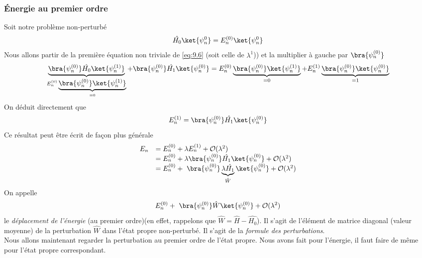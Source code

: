 		\subsubsection{Énergie au premier ordre}
		Soit notre problème non-perturbé
		\begin{equation}
		\hat{H_0}\ket{\psi_n^{0}} = E_n^{(0)}\ket{\psi_n^{0}}
		\end{equation}
		Nous allons partir de la première équation non triviale de \eqref{eq:9.6} (soit 
		celle de $\lambda^1$)) et la multiplier à gauche par $\bra{\psi_n^{(0)}}$
		\begin{equation}
		\underbrace{\bra{\psi_n^{(0)}}\hat{H_0}\ket{\psi_n^{(1)}}}_{E_n^{(0)}\underbrace{
		\bra{\psi_n^{(0)}}\ket{\psi_n^{(1)}}}_{=0}}+\bra{\psi_n^{(0)}}\hat{H_1}\ket{\psi_n^{(0)}} 
		= E_n^{(0)}\underbrace{\bra{\psi_n^{(0)}}\ket{\psi_n^{(1)}}}_{=0}+E_n^{(1)}\underbrace{
		\bra{\psi_n^{(0)}}\ket{\psi_n^{(0)}}}_{=1}
		\end{equation}
		On déduit directement que 
		\begin{equation}
		E_n^{(1)} = \bra{\psi_n^{(0)}}\hat{H_1}\ket{\psi_n^{(0)}}
		\end{equation}
		Ce résultat peut être écrit de façon plus générale
		\begin{equation}
		\begin{array}{ll}
		E_n &= E_n^{(0)}+\lambda E_n^{(1)}+\mathcal{O}(\lambda^2)\\
		&= E_n^{(0)}+\lambda \bra{\psi_n^{(0)}}\hat{H_1}\ket{\psi_n^{(0)}}+\mathcal{O}(\lambda^2)\\
		&= E_n^{(0)}+\ \bra{\psi_n^{(0)}}\underbrace{\lambda\hat{H_1}}_{\hat{W}}\ket{\psi_n
		^{(0)}}+\mathcal{O}(\lambda^2)\\		
		\end{array}
		\end{equation}
		On appelle
		\begin{equation}
		E_n^{(0)}+\ \bra{\psi_n^{(0)}}\hat{W}\ket{\psi_n	^{(0)}}+\mathcal{O}(\lambda^2)
		\end{equation}
		le \textit{déplacement de l'énergie} (au premier ordre)(en effet, rappelons que
		$\hat{W}=\hat{H}-\hat{H_0}$). Il s'agit de l'élément de matrice diagonal (valeur 
		moyenne) de la perturbation $\hat{W}$ dans l'état propre non-perturbé. Il s'agit 
		de la \textit{formule 	des perturbations}.\\		
		
		Nous allons maintenant regarder la perturbation au premier ordre de l'état 
		propre. Nous avons fait pour l'énergie, il faut faire de même pour l'état propre 
		correspondant.
		
